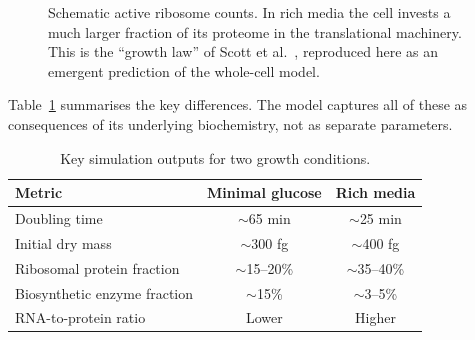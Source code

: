 \documentclass[11pt,a4paper]{article}
\begin{document}
\begin{figure}[H]
\centering
{}
\caption{Schematic active ribosome counts.  In rich media the cell invests a
  much larger fraction of its proteome in the translational machinery.  This
  is the ``growth law'' of Scott et al.~\cite{Scott2010}, reproduced here as
  an emergent prediction of the whole-cell model.}
\label{fig:ribosomes}
\end{figure}

Table~\ref{tab:conditions} summarises the key differences.  The model
captures all of these as consequences of its underlying biochemistry, not as
separate parameters.

\begin{table}[H]
\centering
\caption{Key simulation outputs for two growth conditions.}
\label{tab:conditions}
\begin{tabular}{lcc}
  \toprule
  \textbf{Metric} & \textbf{Minimal glucose} & \textbf{Rich media} \\
  \midrule
  Doubling time             & $\sim$65 min   & $\sim$25 min \\
  Initial dry mass          & $\sim$300 fg   & $\sim$400 fg \\
  Ribosomal protein fraction & $\sim$15--20\% & $\sim$35--40\% \\
  Biosynthetic enzyme fraction & $\sim$15\%  & $\sim$3--5\% \\
  RNA-to-protein ratio       & Lower          & Higher \\
  \bottomrule
\end{tabular}
\end{table}
\end{document}
